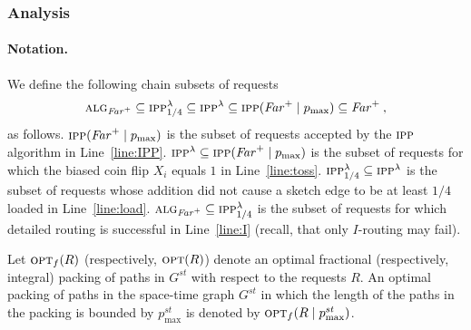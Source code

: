 \documentclass[11pt]{article}
\newcommand{\route}{\text{\sc{ipp}}}
\newcommand{\IPP}{\route}
\newcommand{\opt}{\text{\textsc{opt}}}
\newcommand{\pmax}{p_{\max}}
\newcommand{\alg}{\text{\sc{alg}}}
\newenvironment{proof sketch}[1]{\noindent {\emph{Proof sketch of #1:}}}{\hfill \qed}
\newcommand{\far}{\text{\emph{Far}}}
\newcommand{\algf}{\alg_{\far^+}}
\newcommand{\RIPP}{\IPP(\far^+ \mid \pmax)}\newcommand{\RIPPt}{\IPP^{\lambda}}
\newcommand{\Rinj}{\RIPPt_{1/4}}
\newcommand{\algfar}{\algf}
\begin{document}
\subsubsection{Analysis}

\paragraph{Notation.}
We define the following chain subsets of requests
$$\algfar \subseteq \Rinj \subseteq \RIPPt \subseteq
\RIPP\subseteq \far^+\:,$$ as follows.  $\RIPP$ is the
subset of requests accepted by the $\IPP$ algorithm in
Line~\ref{line:IPP}. $\RIPPt\subseteq \RIPP$ is the subset
of requests for which the biased coin flip $X_i$ equals $1$
in Line~\ref{line:toss}.  $\Rinj \subseteq \RIPPt$ is the
subset of requests whose addition did not cause a sketch
edge to be at least $1/4$ loaded in Line~\ref{line:load}.
$\algfar\subseteq \Rinj$ is the subset of requests for
which detailed routing is successful in Line~\ref{line:I}
(recall, that only $I$-routing may fail).

Let $\opt_f(R)$ (respectively, $\opt(R)$) denote an optimal fractional
(respectively, integral) packing of paths in $G^{st}$ with respect to the
requests $R$. An optimal packing of paths in the space-time graph $G^{st}$ in
which the length of the paths in the packing is bounded by $\pmax^{st}$ is
denoted by $\opt_f(R\mid \pmax^{st})$.
\end{document}
